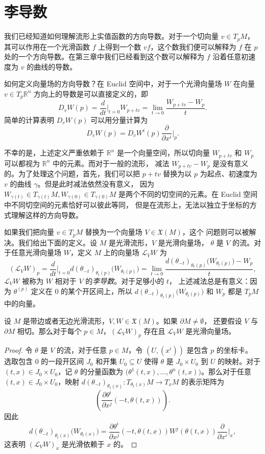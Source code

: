 \section{李导数}

我们已经知道如何理解流形上实值函数的方向导数。对于一个切向量 $v\in T_pM$，
其可以作用在一个光滑函数 $f$ 上得到一个数 $vf$，这个数我们便可以解释为 $f$
在 $p$ 处的一个方向导数。在第三章中我们已经看到这个数可以解释为 $f$
沿着任意初速度为 $v$ 的曲线的导数。

如何定义向量场的方向导数？在 Euclid 空间中，对于一个光滑向量场 $W$
在向量 $v\in T_p \mathbb{R}^n$ 方向上的导数是可以直接定义的，即
\[
  D_vW(p)=\frac{d}{dt}\bigg|_{t=0}W_{p+tv}=
  \lim_{t\to 0}\frac{W_{p+tv}-W_p}{t}.
\]
简单的计算表明 $D_vW(p)$ 可以用分量计算为
\[
  D_vW(p)=D_vW^i(p)\frac{\partial}{\partial x^i}\bigg|_p.
\]

不幸的是，上述定义严重依赖于 $\mathbb{R}^n$ 是一个向量空间，所以切向量
$W_{p+tv}$ 和 $W_p$ 可以都视为 $\mathbb{R}^n$ 中的元素。而对于一般的流形，
减法 $W_{p+tv}-W_p$ 是没有意义的。为了处理这个问题，首先，我们可以把 $p+tv$
替换为以 $p$ 为起点、初速度为 $v$ 的曲线 $\gamma$。但是此时减法依然没有意义，
因为 $W_{\gamma(t)}\in T_{\gamma(t)}M, W_{\gamma(0)}\in T_{\gamma(0)}M$
是两个不同的切空间的元素。在 Euclid 空间中不同切空间的元素恰好可以彼此等同，
但是在流形上，无法以独立于坐标的方式理解这样的方向导数。

如果我们把向量 $v\in T_pM$ 替换为一个向量场 $V\in \mathfrak X(M)$，这个
问题则可以被解决。我们给出下面的定义。设 $M$ 是光滑流形，$V$ 是光滑向量场，
$\theta$ 是 $V$ 的流。对于任意光滑向量场 $W$，定义 $M$ 上的向量场 $\mathcal L_VW$
为
\[
  (\mathcal L_VW)_p=\frac{d}{dt}\bigg|_{t=0}d(\theta_{-t})_{\theta_t(p)}\bigl(W_{\theta_t(p)}\bigr)
  =\lim_{t\to 0}\frac{d(\theta_{-t})_{\theta_t(p)}\bigl(W_{\theta_t(p)}\bigr)-W_p}{t},
\]
$\mathcal L_VW$ 被称为 $W$ 相对于 $V$ 的\emph{李导数}。对于足够小的 $t$，
上述减法总是有意义：因为 $\theta^{(p)}$ 定义在 $0$ 的某个开区间上，所以 
$d(\theta_{-t})_{\theta_t(p)}\bigl(W_{\theta_t(p)}\bigr)$ 和 $W_p$ 都是 $T_pM$ 中的向量。


\begin{lemma}\label{lemma:lie derivation is smooth}
  设 $M$ 是带边或者无边光滑流形，$V,W\in \mathfrak X(M)$。如果 $\partial M\neq\emptyset$，
  还要假设 $V$ 与 $\partial M$ 相切。那么对于每个 $p\in M$，$(\mathcal L_VW)_p$ 存在且
  $\mathcal L_VW$ 是光滑向量场。
\end{lemma}
\begin{proof}
  令 $\theta$ 是 $V$ 的流，对于任意 $p\in M$，令 $(U,(x^i))$ 是包含 $p$ 的坐标卡。
  选取包含 $0$ 的一段开区间 $J_0$ 和开集 $U_0\subseteq U$ 使得 $\theta$
  是 $J_0\times U_0$ 到 $U$ 的映射。对于 $(t,x)\in J_0\times U_0$，记 $\theta$
  的分量函数为 $\bigl(\theta^1(t,x),\dots,\theta^n(t,x)\bigr)$。那么对于任意
  $(t,x)\in J_0\times U_0$，映射 $d(\theta_{-t})_{\theta_t(x)}:T_{\theta_t(x)}M\to T_{x}M$
  的表示矩阵为
  \[
    \left(\frac{\partial \theta^i}{\partial x^j}(-t,\theta(t,x))\right).
  \]
  因此
  \[
    d(\theta_{-t})_{\theta_t(x)}\bigl(W_{\theta_t(x)}\bigr)
    =\frac{\partial \theta^i}{\partial x^j}(-t,\theta(t,x))W^j(\theta(t,x))
    \frac{\partial}{\partial x^i}\bigg|_{x},
  \]
  这表明 $(\mathcal L_VW)_x$ 是光滑依赖于 $x$ 的。
\end{proof}

